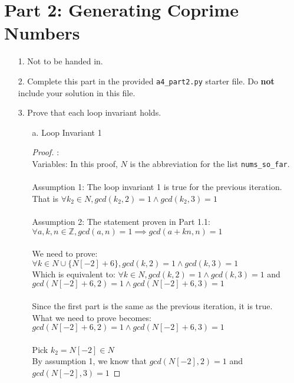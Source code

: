 \documentclass[fontsize=11pt]{article}
\newcommand{\Z}{\mathbb{Z}}
\begin{document}
\newpage

\section*{Part 2: Generating Coprime Numbers}

\begin{enumerate}

\item[1.]
Not to be handed in.

\item[2.]
Complete this part in the provided \texttt{a4\_part2.py} starter file.
Do \textbf{not} include your solution in this file.

\item[3.]
Prove that each loop invariant holds.

\begin{enumerate}
\item[a.] Loop Invariant 1
\begin{proof} : \\
Variables: In this proof, $N$ is the abbreviation for the list \texttt{nums\_so\_far}. \\
\\
Assumption 1: The loop invariant 1 is true for the previous iteration. \\
That is $\forall k_2 \in N, gcd(k_2, 2) = 1 \land gcd(k_2, 3) = 1$ \\
\\
Assumption 2: The statement proven in Part 1.1: \\
$\forall a,k,n \in \Z, gcd(a,n) = 1 \implies gcd(a + kn, n) = 1$ \\
\\
We need to prove: $\forall k \in N \cup \{ N[-2] + 6 \}, gcd(k, 2) = 1 \land gcd(k, 3) = 1$ \\
Which is equivalent to: $\forall k \in N, gcd(k, 2) = 1 \land gcd(k, 3) = 1$ and \\ 
$gcd(N[-2] + 6, 2) = 1 \land gcd(N[-2] + 6, 3) = 1$ \\
\\ 
Since the first part is the same as the previous iteration, it is true. \\
What we need to prove becomes: 
$gcd(N[-2] + 6, 2) = 1 \land gcd(N[-2] + 6, 3) = 1$ \\
\\
Pick $k_2 = N[-2] \in N$ \\
By assumption 1, we know that $gcd(N[-2], 2) = 1$ and $gcd(N[-2], 3) = 1$


\end{proof}
\end{enumerate}
\end{enumerate}
\end{document}
